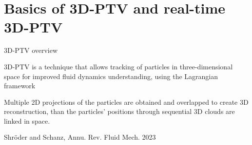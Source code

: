 \section{Basics of 3D-PTV and real-time 3D-PTV}


    

\begin{frame}[label=ptv-1]{3D-PTV overview}
    \begin{multicols}{2}
    \begin{card}
    3D-PTV is a technique that allows tracking of particles in three-dimensional space for improved fluid dynamics understanding, using the Lagrangian framework
    \end{card}
    \begin{card}[TL;DR]
    Multiple 2D projections of the particles are obtained and overlapped to create 3D reconstruction, than the particles' positions through sequential 3D clouds are linked in space. 
    \end{card}
    \end{multicols}
\end{frame}


%
\begin{frame}[label=ptv-2]{Shr\"{o}der and Schanz, Annu. Rev. Fluid Mech. 2023}
\end{frame}


